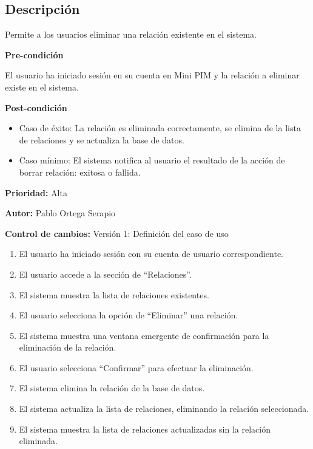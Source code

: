 
\subsection*{Descripción}
Permite a los usuarios eliminar una relación existente en el sistema.\par
\vspace{0.15cm}

\textbf{Pre-condición}\par
El usuario ha iniciado sesión en su cuenta en Mini PIM y la relación a eliminar existe en el sistema.\par
\vspace{0.15cm}

\textbf{Post-condición}
\begin{itemize}
    \item Caso de éxito: La relación es eliminada correctamente, se elimina de la lista de relaciones y se actualiza la base de datos.
    \item Caso mínimo: El sistema notifica al usuario el resultado de la acción de borrar relación: exitosa o fallida.
\end{itemize}

\textbf{Prioridad: }
Alta
\vspace{0.15cm}

\textbf{Autor: }
Pablo Ortega Serapio\par
\vspace{0.15cm}

\textbf{Control de cambios: } Versión 1: Definición del caso de uso

\begin{enumerate}
    \item El usuario ha iniciado sesión con su cuenta de usuario correspondiente.
    \item El usuario accede a la sección de \enquote{Relaciones}.
    \item El sistema muestra la lista de relaciones existentes.
    \item El usuario selecciona la opción de \enquote{Eliminar} una relación.
    \item El sistema muestra una ventana emergente de confirmación para la eliminación de la relación.
    \item El usuario selecciona \enquote{Confirmar} para efectuar la eliminación.
    \item El sistema elimina la relación de la base de datos.
    \item El sistema actualiza la lista de relaciones, eliminando la relación seleccionada.
    \item El sistema muestra la lista de relaciones actualizadas sin la relación eliminada.
\end{enumerate}

